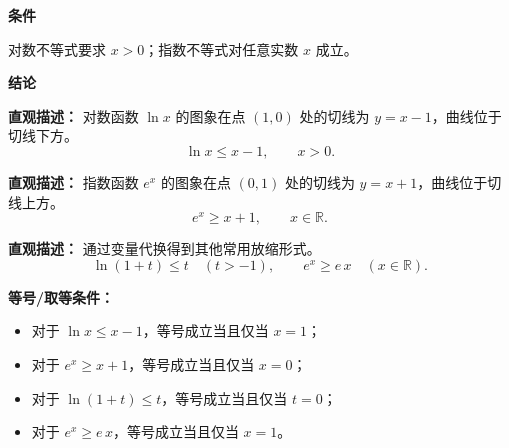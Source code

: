 \begin{statementbox}
	\textbf{\textcolor{CStatement}{条件}}
	\begin{description}[style=nextline, leftmargin=2.8em, labelsep=0.5em, itemsep=0.35em]
		\item[\textbf{\textcolor{CStatement}{条件一（定义域限制）：}}]
		      对数不等式要求 $x>0$；指数不等式对任意实数 $x$ 成立。
	\end{description}

	\medskip
	\textbf{\textcolor{CStatement}{结论}}
	\begin{description}[style=nextline, leftmargin=2.8em, labelsep=0.5em, itemsep=0.45em]
		\item[\textbf{\textcolor{CStatement}{结论一（对数切线）：}}]
		      \textbf{\textcolor{CStatement}{直观描述：}}
		      对数函数 $\ln x$ 的图象在点 $(1,0)$ 处的切线为 $y=x-1$，曲线位于切线下方。
		      \[
			      \boxed{\ln x\le x-1,\qquad x>0.}
		      \]

		\item[\textbf{\textcolor{CStatement}{结论二（指数切线）：}}]
		      \textbf{\textcolor{CStatement}{直观描述：}}
		      指数函数 $e^x$ 的图象在点 $(0,1)$ 处的切线为 $y=x+1$，曲线位于切线上方。
		      \[
			      \boxed{e^x\ge x+1,\qquad x\in\mathbb{R}.}
		      \]

		\item[\textbf{\textcolor{CStatement}{推广结论（常见变形）：}}]
		      \textbf{\textcolor{CStatement}{直观描述：}}
		      通过变量代换得到其他常用放缩形式。
		      \[
			      \boxed{\ln(1+t)\le t\quad (t>-1),}
			      \qquad
			      \boxed{e^x\ge e\,x\quad (x\in\mathbb{R}).}
		      \]
	\end{description}

	\medskip
	\textbf{\textcolor{CStatement}{等号/取等条件：}}
	\begin{itemize}[leftmargin=*, itemsep=0.5em]
		\item 对于 $\ln x\le x-1$，等号成立当且仅当 $x=1$；
		\item 对于 $e^x\ge x+1$，等号成立当且仅当 $x=0$；
		\item 对于 $\ln(1+t)\le t$，等号成立当且仅当 $t=0$；
		\item 对于 $e^x\ge e\,x$，等号成立当且仅当 $x=1$。
	\end{itemize}
\end{statementbox}